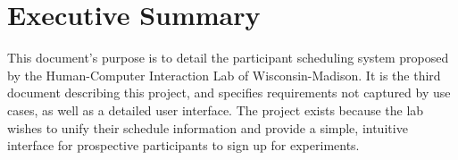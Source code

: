 \newcommand{\puttitle}{Milestone 3}


\section{Executive Summary}
This document's purpose is to detail the participant scheduling system proposed by the Human-Computer Interaction Lab of Wisconsin-Madison. It is the third document describing this project, and specifies requirements not captured by use cases, as well as a detailed user interface.  The project exists because the lab wishes to unify their schedule information and provide a simple, intuitive interface for prospective participants to sign up for experiments.











